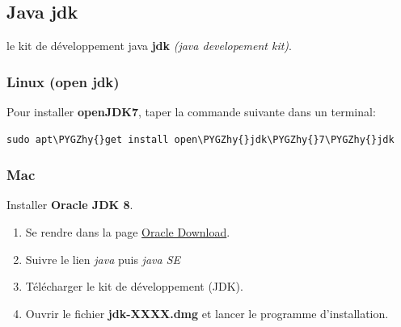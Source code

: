 \documentclass[letterpaper,10pt,english]{sphinxmanual}
\def\PYGZhy{\char`\-}
\begin{document}
\subsection{Java jdk}
\label{installation:java-jdk}
le kit de développement java \textbf{jdk} \emph{(java developement kit)}.


\subsubsection{Linux (open jdk)}
\label{installation:linux-open-jdk}
Pour installer \textbf{openJDK7}, taper la commande suivante dans un terminal:

\begin{Verbatim}[commandchars=\\\{\}]
sudo apt\PYGZhy{}get install open\PYGZhy{}jdk\PYGZhy{}7\PYGZhy{}jdk
\end{Verbatim}


\subsubsection{Mac}
\label{installation:mac}\label{installation:id1}
Installer \textbf{Oracle JDK 8}.
\begin{enumerate}
\item {} 
Se rendre dans la page \href{http://www.oracle.com/us/downloads/index.html}{Oracle Download}.

\item {} 
Suivre le lien \emph{java} puis \emph{java SE}

\item {} 
Télécharger le kit de développement  (JDK).

\item {} 
Ouvrir le fichier \textbf{jdk-XXXX.dmg}  et lancer le programme d'installation.

\end{enumerate}
\end{document}
